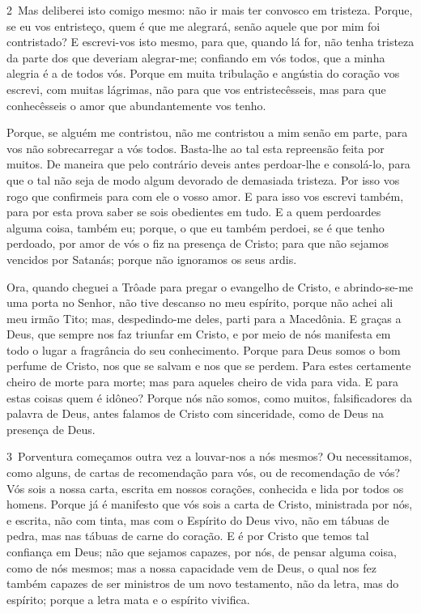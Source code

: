 \medskip

\lettrine{2}\ Mas deliberei isto comigo mesmo: não ir mais ter
convosco em tristeza. Porque, se eu vos entristeço, quem é que
me alegrará, senão aquele que por mim foi contristado? E
escrevi-vos isto mesmo, para que, quando lá for, não tenha tristeza
da parte dos que deveriam alegrar-me; confiando em vós todos, que a
minha alegria é a de todos vós. Porque em muita tribulação e
angústia do coração vos escrevi, com muitas lágrimas, não para que
vos entristecêsseis, mas para que conhecêsseis o amor que
abundantemente vos tenho.

Porque, se alguém me contristou, não me contristou a mim senão em
parte, para vos não sobrecarregar a vós todos. Basta-lhe ao tal
esta repreensão feita por muitos. De maneira que pelo contrário
deveis antes perdoar-lhe e consolá-lo, para que o tal não seja de
modo algum devorado de demasiada tristeza. Por isso vos rogo que
confirmeis para com ele o vosso amor. E para isso vos escrevi
também, para por esta prova saber se sois obedientes em tudo.
E a quem perdoardes alguma coisa, também eu; porque, o que eu
também perdoei, se é que tenho perdoado, por amor de vós o fiz na
presença de Cristo; para que não sejamos vencidos por Satanás;
porque não ignoramos os seus ardis.

Ora, quando cheguei a Trôade para pregar o evangelho de Cristo, e
abrindo-se-me uma porta no Senhor, não tive descanso no meu
espírito, porque não achei ali meu irmão Tito; mas, despedindo-me
deles, parti para a Macedônia. E graças a Deus, que sempre
nos faz triunfar em Cristo, e por meio de nós manifesta em todo o
lugar a fragrância do seu conhecimento. Porque para Deus
somos o bom perfume de Cristo, nos que se salvam e nos que se
perdem. Para estes certamente cheiro de morte para morte; mas
para aqueles cheiro de vida para vida. E para estas coisas quem é
idôneo? Porque nós não somos, como muitos, falsificadores da
palavra de Deus, antes falamos de Cristo com sinceridade, como de
Deus na presença de Deus.

\medskip

\lettrine{3}\ Porventura começamos outra vez a louvar-nos a nós
mesmos? Ou necessitamos, como alguns, de cartas de recomendação para
vós, ou de recomendação de vós? Vós sois a nossa carta, escrita
em nossos corações, conhecida e lida por todos os homens. Porque
já é manifesto que vós sois a carta de Cristo, ministrada por nós, e
escrita, não com tinta, mas com o Espírito do Deus vivo, não em
tábuas de pedra, mas nas tábuas de carne do coração. E é por
Cristo que temos tal confiança em Deus; não que sejamos capazes,
por nós, de pensar alguma coisa, como de nós mesmos; mas a nossa
capacidade vem de Deus, o qual nos fez também capazes de ser
ministros de um novo testamento, não da letra, mas do espírito;
porque a letra mata e o espírito vivifica.

